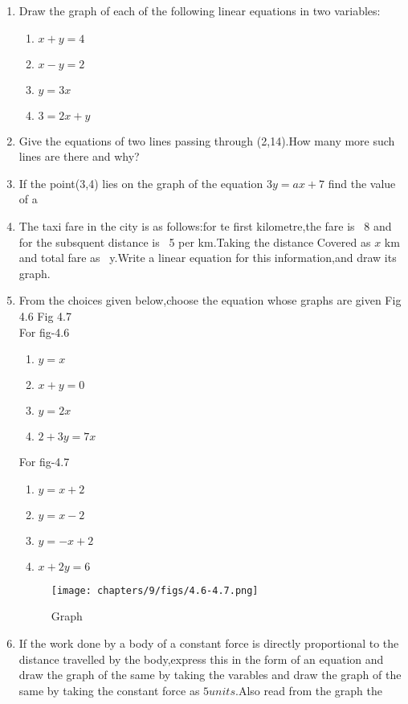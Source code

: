\begin{enumerate}[label=\arabic*.,ref=\theenumi]
\item Draw the graph of each of the following linear equations in two variables:
\begin{enumerate}[label=(\roman*),ref=\theenumi]
\item $x+y=4$
\item $x-y=2$
\item $y=3x$
\item $3=2x+y$
\end{enumerate}
\item Give the equations of two lines passing through (2,14).How many more such lines are there and 
why?
\item If the point(3,4) lies on the graph of the equation $3y=ax+7$ find the value of a
\item The taxi fare in the city is as follows:for te first kilometre,the fare is \rupee~8 and for the 
subsquent distance is \rupee~5 per km.Taking the distance Covered as $x$ km and total fare as
\rupee~y.Write a linear equation for this information,and draw its graph.
\item From the choices given below,choose the equation whose graphs are given Fig 4.6 Fig 4.7
\\
For fig-4.6 
\begin{enumerate}[label=(\roman*)]
\item $y=x$
\item $x+y=0$
\item $y=2x$
\item $2+3y=7x$
\end{enumerate} 
For fig-4.7 
\begin{enumerate}[label=(\roman*)]
\item $y=x+2$
\item $y=x-2$
\item $y=-x+2$
\item $x+2y=6$
\end{enumerate}
\begin{figure}[ht]
\centering
\texttt{[image: chapters/9/figs/4.6-4.7.png]}
\caption{Graph}
  \label{fig:4.6-4.7}
\end{figure}
\item If the work done by a body of a constant force is directly proportional 
to the distance travelled by the body,express this in the form of an equation
and draw the graph of the same by taking the varables and draw the graph of 
the same by taking the constant force as $5 units$.Also read from the graph the

\end{enumerate}
